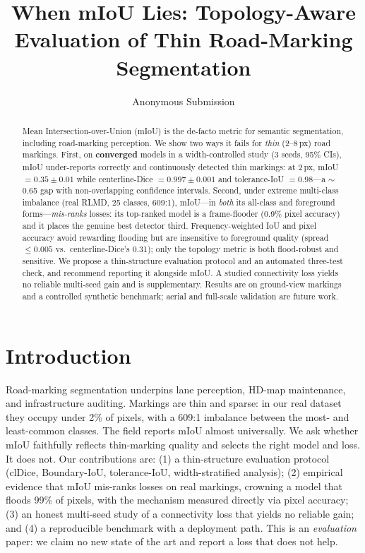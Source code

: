 \documentclass[10pt,twocolumn]{article}
\title{\textbf{When mIoU Lies: Topology-Aware Evaluation of Thin Road-Marking Segmentation}}
\author{Anonymous Submission}
\date{}
\begin{document}
\maketitle

\begin{abstract}
Mean Intersection-over-Union (mIoU) is the de-facto metric for semantic
segmentation, including road-marking perception. We show two ways it fails for
\emph{thin} (2--8\,px) road markings. First, on \textbf{converged} models in a
width-controlled study (3 seeds, 95\% CIs), mIoU under-reports correctly and
continuously detected thin markings: at 2\,px, mIoU $=0.35\pm0.01$ while
centerline-Dice $=0.997\pm0.001$ and tolerance-IoU $=0.98$---a $\sim$0.65 gap with
non-overlapping confidence intervals. Second, under extreme multi-class imbalance
(real RLMD, 25 classes, 609:1), mIoU---in \emph{both} its all-class and foreground
forms---\emph{mis-ranks} losses: its top-ranked model is a frame-flooder (0.9\%
pixel accuracy) and it places the genuine best detector third. Frequency-weighted
IoU and pixel accuracy avoid rewarding flooding but are insensitive to foreground
quality (spread $\le 0.005$ vs.\ centerline-Dice's 0.31); only the topology metric
is both flood-robust and sensitive. We propose a thin-structure evaluation protocol
and an automated three-test check, and recommend reporting it alongside mIoU. A
studied connectivity loss yields no reliable multi-seed gain and is supplementary.
Results are on ground-view markings and a controlled synthetic benchmark; aerial
and full-scale validation are future work.
\end{abstract}

\section{Introduction}
Road-marking segmentation underpins lane perception, HD-map maintenance, and
infrastructure auditing. Markings are thin and sparse: in our real dataset they
occupy under 2\% of pixels, with a 609:1 imbalance between the most- and
least-common classes. The field reports mIoU almost universally. We ask whether
mIoU faithfully reflects thin-marking quality and selects the right model and
loss. It does not. Our contributions are: (1) a thin-structure evaluation protocol
(clDice, Boundary-IoU, tolerance-IoU, width-stratified analysis); (2) empirical
evidence that mIoU mis-ranks losses on real markings, crowning a model that floods
99\% of pixels, with the mechanism measured directly via pixel accuracy; (3) an
honest multi-seed study of a connectivity loss that yields no reliable gain; and
(4) a reproducible benchmark with a deployment path. This is an \emph{evaluation}
paper: we claim no new state of the art and report a loss that does not help.
\end{document}

